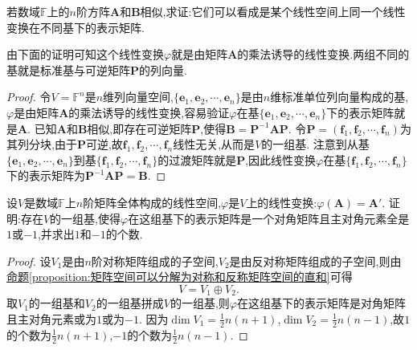 \documentclass[lang=cn,newtx,10pt,scheme=chinese]{elegantbook}
\begin{document}
\begin{proposition}\label{proposition:相似矩阵可看作一个线性变换在不同基下的表示矩阵}
若数域\(\mathbb{F}\)上的\(n\)阶方阵\(\boldsymbol{A}\)和\(\boldsymbol{B}\)相似,求证:它们可以看成是某个线性空间上同一个线性变换在不同基下的表示矩阵.
\end{proposition}
\begin{note}
    由下面的证明可知这个线性变换\(\varphi\)就是由矩阵\(\boldsymbol{A}\)的乘法诱导的线性变换.两组不同的基就是标准基与可逆矩阵\(\boldsymbol{P}\)的列向量.
\end{note}
\begin{proof}
    令\(V = \mathbb{F}^n\)是\(n\)维列向量空间,\(\{\boldsymbol{e}_1,\boldsymbol{e}_2,\cdots,\boldsymbol{e}_n\}\)是由\(n\)维标准单位列向量构成的基,\(\varphi\)是由矩阵\(\boldsymbol{A}\)的乘法诱导的线性变换,容易验证\(\varphi\)在基\(\{\boldsymbol{e}_1,\boldsymbol{e}_2,\cdots,\boldsymbol{e}_n\}\)下的表示矩阵就是\(\boldsymbol{A}\). 已知\(\boldsymbol{A}\)和\(\boldsymbol{B}\)相似,即存在可逆矩阵\(\boldsymbol{P}\),使得\(\boldsymbol{B}=\boldsymbol{P}^{-1}\boldsymbol{A}\boldsymbol{P}\).
令\(\boldsymbol{P}=(\boldsymbol{f}_1,\boldsymbol{f}_2,\cdots,\boldsymbol{f}_n)\)为其列分块,由于\(\boldsymbol{P}\)可逆,故\(\boldsymbol{f}_1,\boldsymbol{f}_2,\cdots,\boldsymbol{f}_n\)线性无关,从而是\(V\)的一组基. 注意到从基\(\{\boldsymbol{e}_1,\boldsymbol{e}_2,\cdots,\boldsymbol{e}_n\}\)到基\(\{\boldsymbol{f}_1,\boldsymbol{f}_2,\cdots,\boldsymbol{f}_n\}\)的过渡矩阵就是\(\boldsymbol{P}\),因此线性变换\(\varphi\)在基\(\{\boldsymbol{f}_1,\boldsymbol{f}_2,\cdots,\boldsymbol{f}_n\}\)下的表示矩阵为\(\boldsymbol{P}^{-1}\boldsymbol{A}\boldsymbol{P}=\boldsymbol{B}\). 
\end{proof}

\begin{example}
设\(V\)是数域\(\mathbb{F}\)上\(n\)阶矩阵全体构成的线性空间,\(\varphi\)是\(V\)上的线性变换:\(\varphi(\boldsymbol{A})=\boldsymbol{A}'\). 证明:存在\(V\)的一组基,使得\(\varphi\)在这组基下的表示矩阵是一个对角矩阵且主对角元素全是\(1\)或\(-1\),并求出\(1\)和\(-1\)的个数.
\end{example}
\begin{proof}
    设\(V_1\)是由\(n\)阶对称矩阵组成的子空间,\(V_2\)是由反对称矩阵组成的子空间,则由\hyperref[proposition:矩阵空间可以分解为对称和反称矩阵空间的直和]{命题\ref{proposition:矩阵空间可以分解为对称和反称矩阵空间的直和}}可得
\[
V = V_1\oplus V_2.
\]
取\(V_1\)的一组基和\(V_2\)的一组基拼成\(V\)的一组基,则\(\varphi\)在这组基下的表示矩阵是对角矩阵且主对角元素或为\(1\)或为\(-1\). 因为\(\dim V_1=\frac{1}{2}n(n + 1)\),\(\dim V_2=\frac{1}{2}n(n - 1)\),故\(1\)的个数为\(\frac{1}{2}n(n + 1)\),\(-1\)的个数为\(\frac{1}{2}n(n - 1)\).
\end{proof}
\end{document}
